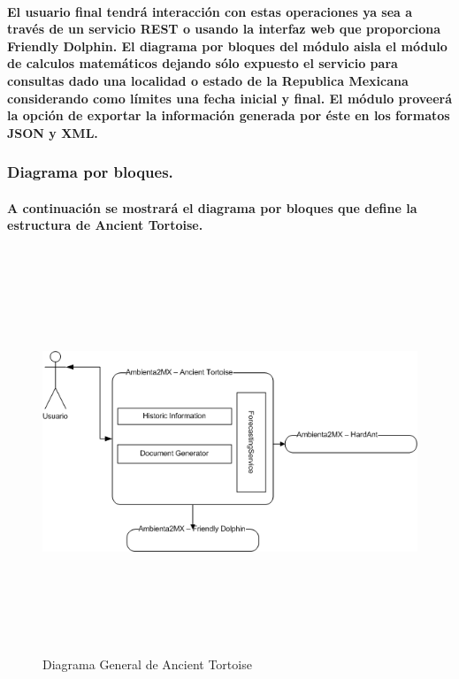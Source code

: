       \paragraph{El usuario final tendrá interacción con estas operaciones ya sea a través de un servicio REST o usando la interfaz web que proporciona Friendly Dolphin. El diagrama por bloques del módulo aisla el módulo de calculos matemáticos dejando sólo expuesto el servicio para consultas dado una localidad o estado de la Republica Mexicana considerando como límites una fecha inicial y final. El módulo proveerá la opción de exportar la información generada por éste en los formatos JSON y XML.}
      \begin{landscape}
      \subsubsection{Diagrama por bloques.}
        \paragraph{A continuación se mostrará el diagrama por bloques que define la estructura de Ancient Tortoise.}
        \begin{figure}[h!]
        \centering
        \includegraphics[width=22.5cm,height=12cm]{./images/DiagramaAncientTortoise.png}
        \caption{Diagrama General de Ancient Tortoise}
      \end{figure}
      \end{landscape}
